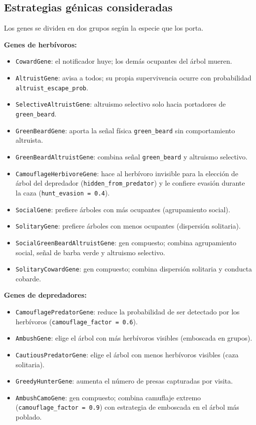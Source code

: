 \documentclass[11pt,a4paper]{article}
\begin{document}
\subsection{Estrategias g\'enicas consideradas}

Los genes se dividen en dos grupos seg\'un la especie que los porta.

\textbf{Genes de herb\'ivoros:}
\begin{itemize}
    \item \texttt{CowardGene}: el notificador huye; los dem\'as ocupantes del \'arbol mueren.
    \item \texttt{AltruistGene}: avisa a todos; su propia supervivencia ocurre con probabilidad \texttt{altruist\_escape\_prob}.
    \item \texttt{SelectiveAltruistGene}: altruismo selectivo solo hacia portadores de \texttt{green\_beard}.
    \item \texttt{GreenBeardGene}: aporta la se\~nal f\'isica \texttt{green\_beard} sin comportamiento altruista.
    \item \texttt{GreenBeardAltruistGene}: combina se\~nal \texttt{green\_beard} y altruismo selectivo.
    \item \texttt{CamouflageHerbivoreGene}: hace al herb\'ivoro invisible para la elecci\'on de \'arbol del depredador
    (\texttt{hidden\_from\_predator}) y le confiere evasión durante la caza (\texttt{hunt\_evasion\,=\,0.4}).
    \item \texttt{SocialGene}: prefiere \'arboles con m\'as ocupantes (agrupamiento social).
    \item \texttt{SolitaryGene}: prefiere \'arboles con menos ocupantes (dispersi\'on solitaria).
    \item \texttt{SocialGreenBeardAltruistGene}: gen compuesto; combina agrupamiento social,
    se\~nal de barba verde y altruismo selectivo.
    \item \texttt{SolitaryCowardGene}: gen compuesto; combina dispersi\'on solitaria y conducta cobarde.
\end{itemize}

\textbf{Genes de depredadores:}
\begin{itemize}
    \item \texttt{CamouflagePredatorGene}: reduce la probabilidad de ser detectado por los herb\'ivoros
    (\texttt{camouflage\_factor\,=\,0.6}).
    \item \texttt{AmbushGene}: elige el \'arbol con m\'as herb\'ivoros visibles (emboscada en grupos).
    \item \texttt{CautiousPredatorGene}: elige el \'arbol con menos herb\'ivoros visibles (caza solitaria).
    \item \texttt{GreedyHunterGene}: aumenta el n\'umero de presas capturadas por visita.
    \item \texttt{AmbushCamoGene}: gen compuesto; combina camuflaje extremo
    (\texttt{camouflage\_factor\,=\,0.9}) con estrategia de emboscada en el \'arbol m\'as poblado.
\end{itemize}
\end{document}
